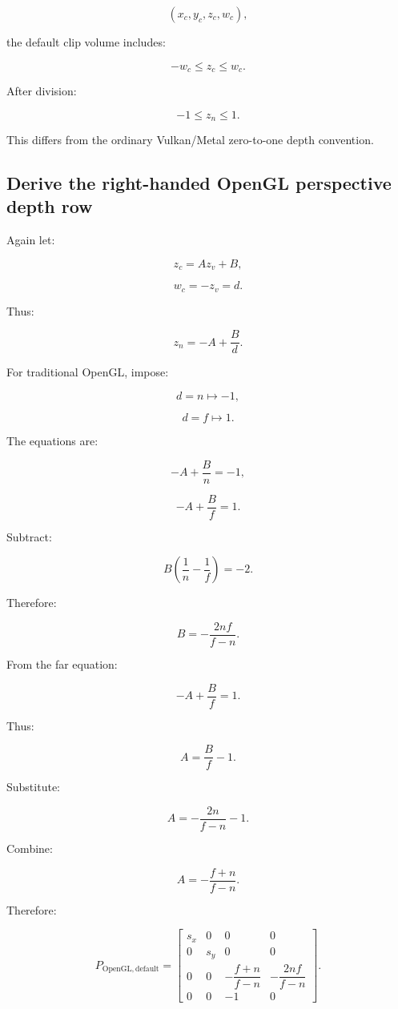 \[
 (x_c,y_c,z_c,w_c),
\]

the default clip volume includes:

\[
 \boxed{-w_c\le z_c\le w_c}.
\]

After division:

\[
 \boxed{-1\le z_n\le1}.
\]

This differs from the ordinary Vulkan/Metal zero-to-one depth convention.

\subsection{Derive the right-handed OpenGL perspective depth row}\label{02-foundations-ii-ch033-derive-the-right-handed-opengl-perspective-depth-row}

Again let:

\[
 z_c=Az_v+B,
\]

\[
 w_c=-z_v=d.
\]

Thus:

\[
 z_n=-A+\frac Bd.
\]

For traditional OpenGL, impose:

\[
 d=n\mapsto-1,
\]

\[
 d=f\mapsto1.
\]

The equations are:

\[
 -A+\frac Bn=-1,
\]

\[
 -A+\frac Bf=1.
\]

Subtract:

\[
 B\left(\frac1n-\frac1f\right)=-2.
\]

Therefore:

\[
 B=-\frac{2nf}{f-n}.
\]

From the far equation:

\[
 -A+\frac Bf=1.
\]

Thus:

\[
 A=\frac Bf-1.
\]

Substitute:

\[
 A=-\frac{2n}{f-n}-1.
\]

Combine:

\[
 \boxed{ A=-\frac{f+n}{f-n} }.
\]

Therefore:

\[
 \boxed{ P_{\mathrm{OpenGL,default}}= \begin{bmatrix} s_x&0&0&0\\ 0&s_y&0&0\\ 0&0&-\dfrac{f+n}{f-n}&-\dfrac{2nf}{f-n}\\ 0&0&-1&0 \end{bmatrix} }.
\]

